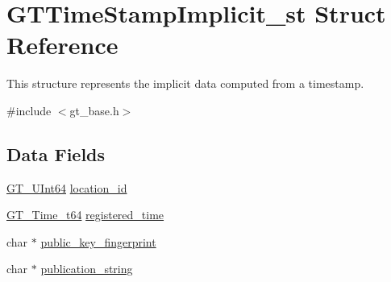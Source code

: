 \hypertarget{struct_g_t_time_stamp_implicit__st}{
\section{GTTimeStampImplicit\_\-st Struct Reference}
\label{struct_g_t_time_stamp_implicit__st}
}


This structure represents the implicit data computed from a timestamp.  




{\ttfamily \#include $<$gt\_\-base.h$>$}

\subsection*{Data Fields}
\begin{DoxyCompactItemize}
\item 
\hyperlink{group__common_gab05f0d6e953c4aee143ec3063384dd77}{GT\_\-UInt64} \hyperlink{struct_g_t_time_stamp_implicit__st_a273697a4a7153e06a17c9e501742e284}{location\_\-id}
\item 
\hyperlink{group__common_ga4cc54826c21e0ed438d8e35be7039328}{GT\_\-Time\_\-t64} \hyperlink{struct_g_t_time_stamp_implicit__st_aeef9c4e75ef9a4c3c679ecfe47568957}{registered\_\-time}
\item 
char $\ast$ \hyperlink{struct_g_t_time_stamp_implicit__st_af7c3030365e19743b105892ded2b1060}{public\_\-key\_\-fingerprint}
\item 
char $\ast$ \hyperlink{struct_g_t_time_stamp_implicit__st_a06dd47a8c94b77efe8136e81f1ca5674}{publication\_\-string}
\end{DoxyCompactItemize}


